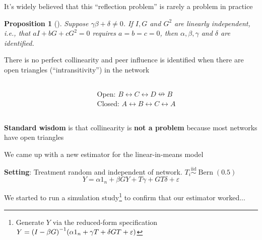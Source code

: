 \documentclass[aspectratio=169]{beamer}
\DeclarePairedDelimiter{\paren}{(}{)}
\newcommand \diid {\stackrel{\mathrm{iid}}{\sim}}
\DeclareMathOperator*{\Bern}{Bern}
\newtheorem{proposition}{Proposition}
\theoremstyle{remark}
\begin{document}
\begin{frame}{It's widely believed that this ``reflection problem'' is rarely a problem in practice}
    
    \begin{proposition}[\citealt{bramoulle2009}]
        Suppose $\gamma \beta + \delta \neq 0$. If $I, G$ and $G^2$ are linearly independent, i.e., that $a I + b G + c G^2 = 0$ requires $a = b = c = 0$, then $\alpha, \beta, \gamma$ and $\delta$ are identified.
    \end{proposition}
    
    There is no perfect collinearity and peer influence is identified when there are \textcolor{Mahogany}{open triangles} (``intransitivity'') in the network
    \begin{columns}
        \begin{column}{0.5\textwidth}
            \centering
        \end{column}
        \begin{column}{0.5\textwidth}
            \centering
            Open: \textcolor{Mahogany}{$B \leftrightarrow C \leftrightarrow D \nleftrightarrow B$} \\
            Closed: $A \leftrightarrow B \leftrightarrow C \leftrightarrow A$
        \end{column}
    \end{columns}
    \vspace{2mm}
    \textbf{Standard wisdom} is that collinearity is \textbf{not a problem} because most networks have open triangles
\end{frame}

\begin{frame}{We came up with a new estimator for the linear-in-means model}
    
    \textbf{Setting}: Treatment random and independent of network. $T_i \diid \Bern(0.5)$ \\
    
    \Large
    \begin{equation*}
        Y = \alpha 1_n + \beta G Y + T \gamma + G T \delta + \varepsilon
    \end{equation*}
    
    \normalsize
    We started to run a simulation study\footnote{Generate $Y$ via the reduced-form specification $Y = \paren*{I - \beta G}^{-1} \paren*{\alpha 1_n + \gamma T + \delta G T + \varepsilon}$} to confirm that our estimator worked...
    
\end{frame}
\end{document}
